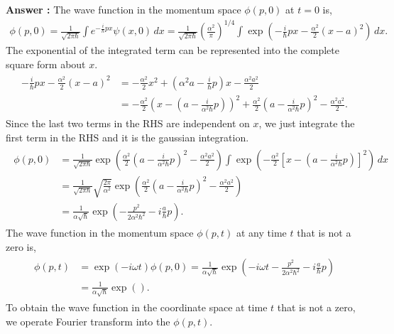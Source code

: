 \documentclass[floatfix,nofootinbib,superscriptaddress,fleqn]{revtex4-2}
\begin{document}
\noindent \textbf{Answer : }
The wave function in the momentum space $\phi(p,0)$ at $t=0$ is,
\begin{align}
  \phi(p,0) = \frac{1}{\sqrt{2\pi\hbar}}
  \int e^{-\frac{i}{\hbar}px}\psi(x,0)\,dx
  = \frac{1}{\sqrt{2\pi\hbar}}\left(\frac{\alpha^2}{\pi}\right)^{1/4} 
  \int \exp{\left(-\frac{i}{\hbar}px-\frac{\alpha^2}{2}(x-a)^2\right)} \,dx.
\end{align}
The exponential of the integrated term can be represented into the 
complete square form about $x$.
\begin{align}
  \begin{split}
    -\frac{i}{\hbar}px-\frac{\alpha^2}{2}(x-a)^2
    &=-\frac{\alpha^2}{2}x^2+\left(\alpha^2 a
    -\frac{i}{\hbar}p\right)x-\frac{\alpha^2a^2}{2}\\
    &=-\frac{\alpha^2}{2}\left(x-\left(a-\frac{i}
    {\alpha^2\hbar}p\right)\right)^2
    +\frac{\alpha^2}{2}\left(a-\frac{i}{\alpha^2\hbar}p\right)^2
    -\frac{\alpha^2a^2}{2}.
  \end{split}
\end{align}
Since the last two terms in the RHS are independent on $x$,
we just integrate the first term in the RHS and 
it is the gaussian integration.
\begin{align}
  \begin{split}
    \phi(p,0) &= \frac{1}{\sqrt{2\pi\hbar}}\exp{\left(\frac{\alpha^2}{2}
    \left(a-\frac{i}{\alpha^2\hbar}p\right)^2
    -\frac{\alpha^2a^2}{2}\right)}
    \int\exp{\left(-\frac{\alpha^2}{2}\left[x-\left(a-\frac{i}
    {\alpha^2\hbar}p\right)\right]^2\right)}\,dx  \\
    &=\frac{1}{\sqrt{2\pi\hbar}}\sqrt{\frac{2\pi}{\alpha^2}}
    \exp{\left(\frac{\alpha^2}{2}
    \left(a-\frac{i}{\alpha^2\hbar}p\right)^2
    -\frac{\alpha^2a^2}{2}\right)}  \\
    &= \frac{1}{\alpha\sqrt{\hbar}}
    \exp{\left(-\frac{p^2}{2\alpha^2\hbar^2}-i\frac{a}{\hbar}p\right)}.
  \end{split}
\end{align}
The wave function in the momentum space $\phi(p,t)$ at any time $t$ that is not a zero is,
\begin{align}
  \begin{split}
    \phi(p,t) &= \exp{\left({-i\omega t}\right)}\phi(p,0)
    = \frac{1}{\alpha\sqrt{\hbar}}
    \exp{\left(-i\omega t-\frac{p^2}{2\alpha^2\hbar^2}
    -i\frac{a}{\hbar}p\right)} \\
    &=\frac{1}{\alpha\sqrt{\hbar}}
    \exp{\left(  \right)}.
  \end{split}
\end{align}
To obtain the wave function in the coordinate space at time $t$ that is not a zero,
we operate Fourier transform into the $\phi(p,t)$.
\end{document}
